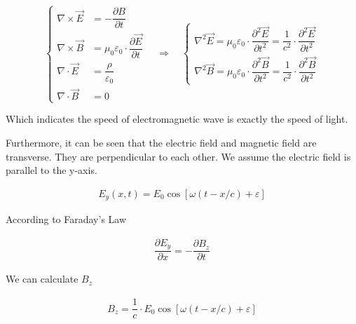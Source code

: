 \begin{equation*}
  \left\{
  \begin{aligned}
    \nabla \times \vec{E} &= - \dfrac{\partial B}{\partial t} \\
    \nabla \times \vec{B} &= \mu_{0} \varepsilon_{0} \cdot \dfrac{\partial \vec{E}}{\partial t}  \\
    \nabla \cdot \vec{E} &= \dfrac{\rho}{\varepsilon_{0}} \\
    \nabla \cdot \vec{B} &= 0
  \end{aligned}
  \right.
  \quad \Rightarrow \quad
  \left\{
  \begin{aligned}
    \nabla^{2} \vec{E} = \mu_{0} \varepsilon_{0} \cdot \dfrac{\partial^{2} \vec{E}}{\partial t^{2}}= \dfrac{1}{c^2} \cdot \dfrac{\partial^2 \vec{E}}{\partial t^2}  \\
    \nabla^{2} \vec{B} = \mu_{0} \varepsilon_{0} \cdot \dfrac{\partial^{2} \vec{B}}{\partial t^{2}}  = \dfrac{1}{c^2} \cdot \dfrac{\partial^2 \vec{B}}{\partial t^2}  
  \end{aligned}
  \right.
\end{equation*}

Which indicates the speed of electromagnetic wave is exactly the speed of light.

Furthermore, it can be seen that the electric field and magnetic field are transverse. They are perpendicular to each other. We assume the electric field is parallel to the y-axis.

\begin{equation*}
  \begin{aligned}
    E_{y} (x,t) = E_{0} \cos \left[ \omega \left( t - x/c  \right) + \varepsilon \right]
  \end{aligned}
\end{equation*}

According to Faraday's Law

\begin{equation*}
  \begin{aligned}
    \dfrac{\partial E_{y}}{\partial x} = - \dfrac{\partial B_{z}}{\partial t}  
  \end{aligned}
\end{equation*}

We can calculate $B_{z}$

\begin{equation*}
  \begin{aligned}
    B_z = \dfrac{1}{c} \cdot E_{0} \cos \left[ \omega \left( t - x/c  \right) + \varepsilon \right]
  \end{aligned}
\end{equation*}

